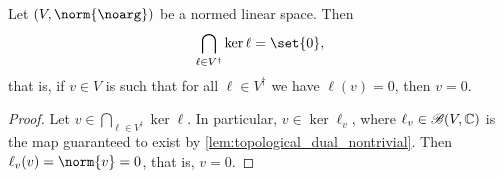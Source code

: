 \begin{corollary}
    Let \((V, \norm{\noarg})\) be a normed linear space. Then
    \begin{equation*}
        \bigcap_{\ell \in V^\dag} \ker \ell = \set{0},
    \end{equation*}
    that is, if \(v \in V\) is such that for all \(\ell \in V^\dag\) we have \(\ell(v) = 0\), then \(v = 0\).
\end{corollary}
\begin{proof}
    Let \(v \in \bigcap_{\ell \in V^\dag}\ker\ell\). In particular, \(v \in \ker\ell_v\), where \(\ell_v \in \mathscr{B}(V, \mathbb{C})\) is the map guaranteed to exist by \cref{lem:topological_dual_nontrivial}. Then \(\ell_v(v) = \norm{v} = 0\), that is, \(v = 0\).
\end{proof}

